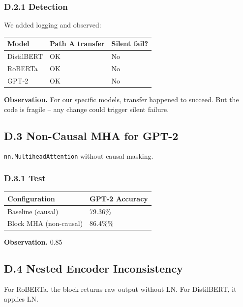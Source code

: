\subsubsection{D.2.1 Detection}

We added logging and observed:

\begin{table}[H]
\centering
\small
\begin{tabular}{lll}
\toprule
\textbf{Model} & \textbf{Path A transfer} & \textbf{Silent fail?} \\
\midrule
DistilBERT & OK & No \\
RoBERTa & OK & No \\
GPT-2 & OK & No \\
\bottomrule
\end{tabular}
\end{table}

\textbf{Observation.} For our specific models, transfer happened to succeed. But 
the code is fragile -- any change could trigger silent failure.

\subsection{D.3 Non-Causal MHA for GPT-2}

\texttt{nn.MultiheadAttention} without causal masking.

\subsubsection{D.3.1 Test}

\begin{table}[H]
\centering
\small
\begin{tabular}{ll}
\toprule
\textbf{Configuration} & \textbf{GPT-2 Accuracy} \\
\midrule
Baseline (causal) & 79.36\% \\
Block MHA (non-causal) & 86.4\%\% \\
\bottomrule
\end{tabular}
\end{table}

\textbf{Observation.} 0.85

\subsection{D.4 Nested Encoder Inconsistency}

For RoBERTa, the block returns raw output without LN. For DistilBERT, it 
applies LN.

